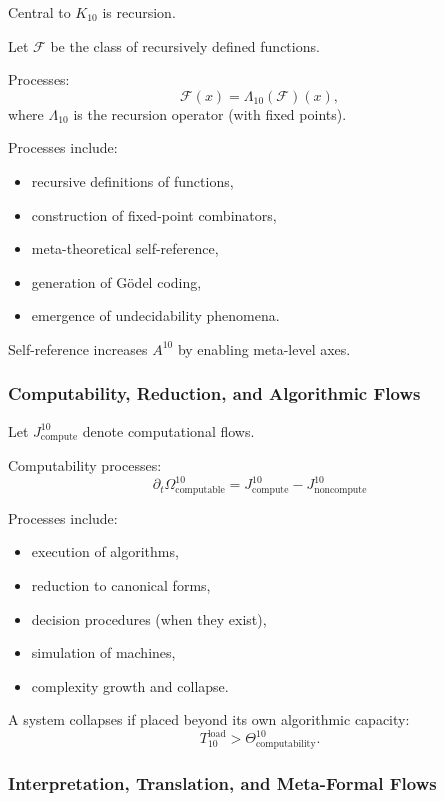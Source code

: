 Central to $K_{10}$ is recursion.

Let $\mathcal{F}$ be the class of recursively defined functions.

Processes:
\[
\mathcal{F}(x) = \Lambda_{10}(\mathcal{F})(x),
\]
where $\Lambda_{10}$ is the recursion operator (with fixed points).

Processes include:
\begin{itemize}
    \item recursive definitions of functions,
    \item construction of fixed-point combinators,
    \item meta-theoretical self-reference,
    \item generation of Gödel coding,
    \item emergence of undecidability phenomena.
\end{itemize}

Self-reference increases $A^{10}$ by enabling meta-level axes.

\subsubsection{Computability, Reduction, and Algorithmic Flows}

Let $J^{10}_{\text{compute}}$ denote computational flows.

Computability processes:
\[
\partial_t \Omega^{10}_{\text{computable}}
= J^{10}_{\text{compute}} - J^{10}_{\text{noncompute}}
\]

Processes include:
\begin{itemize}
    \item execution of algorithms,
    \item reduction to canonical forms,
    \item decision procedures (when they exist),
    \item simulation of machines,
    \item complexity growth and collapse.
\end{itemize}

A system collapses if placed beyond its own algorithmic capacity:
\[
T_{10}^{\text{load}} > \Theta^{10}_{\text{computability}}.
\]

\subsubsection{Interpretation, Translation, and Meta-Formal Flows}


